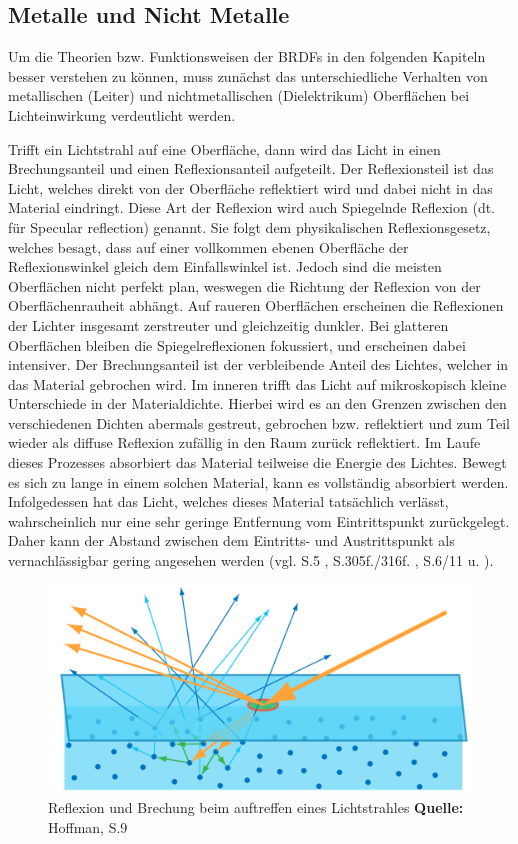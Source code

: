 \documentclass[
  11pt,
  a4paper,
  oneside
  ]{article}
\begin{document}
\subsection{Metalle und Nicht Metalle}
Um die Theorien bzw. Funktionsweisen der BRDFs in den folgenden Kapiteln besser verstehen zu können, muss zunächst das unterschiedliche Verhalten von metallischen (Leiter) und nichtmetallischen (Dielektrikum) Oberflächen bei Lichteinwirkung verdeutlicht werden.

Trifft ein Lichtstrahl auf eine Oberfläche, dann wird das Licht in einen Brechungsanteil und einen Reflexionsanteil aufgeteilt. Der Reflexionsteil ist das Licht, welches direkt von der Oberfläche reflektiert wird und dabei nicht in das Material eindringt. Diese Art der Reflexion wird auch Spiegelnde Reflexion (dt. für Specular reflection) genannt. Sie folgt dem physikalischen Reflexionsgesetz, welches besagt, dass auf einer vollkommen ebenen Oberfläche der Reflexionswinkel gleich dem Einfallswinkel ist. Jedoch sind die meisten Oberflächen nicht perfekt plan, weswegen die Richtung der Reflexion von der Oberflächenrauheit abhängt. Auf raueren Oberflächen erscheinen die Reflexionen der Lichter insgesamt zerstreuter und gleichzeitig dunkler. Bei glatteren Oberflächen bleiben die Spiegelreflexionen fokussiert, und erscheinen dabei intensiver. Der Brechungsanteil ist der verbleibende Anteil des Lichtes, welcher in das Material gebrochen wird. Im inneren trifft das Licht auf mikroskopisch kleine Unterschiede in der Materialdichte. Hierbei wird es an den Grenzen zwischen den verschiedenen Dichten abermals gestreut, gebrochen bzw. reflektiert und zum Teil wieder als diffuse Reflexion zufällig in den Raum zurück reflektiert. Im Laufe dieses Prozesses absorbiert das Material teilweise die Energie des Lichtes. Bewegt es sich zu lange in einem solchen Material, kann es vollständig absorbiert werden. Infolgedessen hat das Licht, welches dieses Material tatsächlich verlässt, wahrscheinlich nur eine sehr geringe Entfernung vom Eintrittspunkt zurückgelegt. Daher kann der Abstand zwischen dem Eintritts- und Austrittspunkt als vernachlässigbar gering angesehen werden 
(vgl. S.5 \cite{irrlichtOrg}, S.305f./316f. \cite{realTimeRendering4th}, S.6/11 \cite{rtrPaper} u. \cite{learnOpenGL,pbrGuide,googleFilamentPbr}).
\begin{figure}[H]
  \centering
  \includegraphics*[width=0.65 \textwidth]{images/scattering.png}
  \caption{Reflexion und Brechung beim auftreffen eines Lichtstrahles \footnotesize\textbf{Quelle:} Hoffman, S.9 \cite{rtrPaper}}
  \label{fig:img10}
\end{figure}
\end{document}
